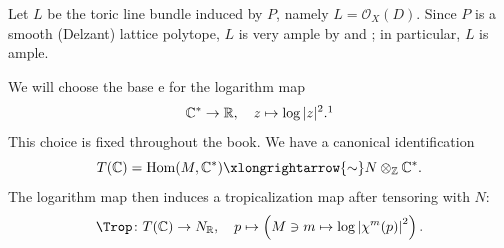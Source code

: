 Let $L$ be the toric line bundle induced by $P$, namely $L=\mathcal{O}_X(D)$. Since $P$ is a smooth (Delzant) lattice polytope, $L$ is very ample by \cite[Proposition~2.4.4, Proposition~6.1.10]{CLS11} and \cite[Theorems~18.7.3 and~18.8.5]{FPT}; in particular, $L$ is ample.

We will choose the base $\mathrm{e}$ for the logarithm map
\begin{equation}\label{eq:log}
\mathbb{C}^*\rightarrow \mathbb{R},\quad z\mapsto \log|z|^2.\footnotemark
\end{equation}
This choice is fixed throughout the book. We have a canonical identification
\[
T(\mathbb{C})=\mathrm{Hom}(M,\mathbb{C}^*)\xlongrightarrow{\sim} N\otimes_{\mathbb{Z}}\mathbb{C}^*.
\]
The logarithm map then induces a tropicalization map after tensoring with $N$:
\begin{equation}
\Trop\colon T(\mathbb{C})\rightarrow N_{\mathbb{R}},\quad p\mapsto \left( M \ni m\mapsto \log \left|\chi^m(p)\right|^2 \right).
\end{equation}
\index{$\Trop$}

